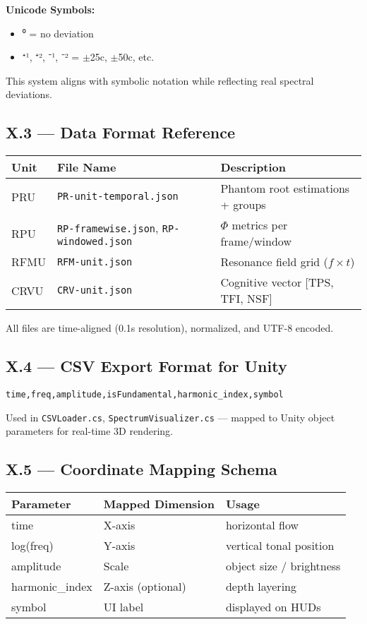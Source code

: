 \documentclass{article}
\begin{document}
\textbf{Unicode Symbols:}
\begin{itemize}
    \item ⁰ = no deviation
    \item ⁺¹, ⁺², ⁻¹, ⁻² = $\pm$25c, $\pm$50c, etc.
\end{itemize}

This system aligns with symbolic notation while reflecting real spectral deviations.

\subsection*{X.3 — Data Format Reference}

\begin{center}
\begin{tabular}{|l|l|p{7.5cm}|}
\hline
\textbf{Unit} & \textbf{File Name} & \textbf{Description} \\
\hline
PRU & \texttt{PR-unit-temporal.json} & Phantom root estimations + groups \\
RPU & \texttt{RP-framewise.json}, \texttt{RP-windowed.json} & $\Phi$ metrics per frame/window \\
RFMU & \texttt{RFM-unit.json} & Resonance field grid ($f \times t$) \\
CRVU & \texttt{CRV-unit.json} & Cognitive vector [TPS, TFI, NSF] \\
\hline
\end{tabular}
\end{center}

All files are time-aligned (0.1s resolution), normalized, and UTF-8 encoded.

\subsection*{X.4 — CSV Export Format for Unity}

\begin{verbatim}
time,freq,amplitude,isFundamental,harmonic_index,symbol
\end{verbatim}

Used in \texttt{CSVLoader.cs}, \texttt{SpectrumVisualizer.cs} — mapped to Unity object parameters for real-time 3D rendering.

\subsection*{X.5 — Coordinate Mapping Schema}

\begin{center}
\begin{tabular}{|l|l|l|}
\hline
\textbf{Parameter} & \textbf{Mapped Dimension} & \textbf{Usage} \\
\hline
time & X-axis & horizontal flow \\
log(freq) & Y-axis & vertical tonal position \\
amplitude & Scale & object size / brightness \\
harmonic\_index & Z-axis (optional) & depth layering \\
symbol & UI label & displayed on HUDs \\
\hline
\end{tabular}
\end{center}
\end{document}
